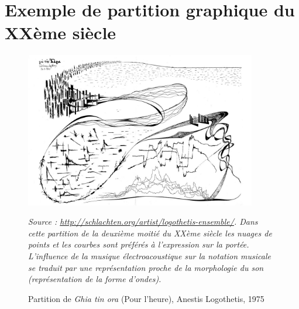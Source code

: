 \section{Exemple de partition graphique du XXème siècle}
\label{sec:exempleAnestisLogothetis}
\begin{figure}[H]
	\centering
	\includegraphics[keepaspectratio=true, width=0.9\textwidth]{Annexes/i/exempleAnestisLogothetis.jpg}
	\caption{Partition de \textit{Ghia tin ora} (Pour l'heure), Anestis Logothetis, 1975} 	
	\label{fig:exempleAnestisLogothetis}
	\medskip
	\small
	\it	
	Source : \url{http://schlachten.org/artist/logothetis-ensemble/}. Dans cette partition de la deuxième moitié du XXème siècle les nuages de points et les courbes sont préférés à l'expression sur la portée. L'influence de la musique électroacoustique sur la notation musicale se traduit par une représentation proche de la morphologie du son (représentation de la forme d'ondes).
\end{figure}
\clearpage

\clearpage

